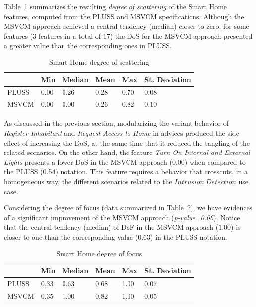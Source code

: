 \documentclass{sig-alt-full}
\begin{document}
Table~\ref{tab:sh-dos} summarizes the resulting \emph{degree of scattering} of
the Smart Home features, computed from the PLUSS and MSVCM specifications.
Although the MSVCM approach achieved a central tendency (median) closer to
zero, for some features (3 features in a total of 17) the DoS for the MSVCM approach
presented a greater value than the corresponding ones in PLUSS.


\begin{table}[htb]
\centering
\caption{Smart Home degree of scattering}
\label{tab:sh-dos}
\begin{small}
\begin{tabular}{llllll} \hline
					& Min 	& Median 	& Mean 	& Max 	& St. Deviation \\ \hline 
	PLUSS			& 0.00  & 0.26   	& 0.28  & 0.70 	& 0.08 			\\
	MSVCM	& 0.00  & 0.00  	& 0.26 	& 0.82 & 0.10  		\\ \hline	
\end{tabular}
\end{small}
\end{table}

As discussed in the previous section, modularizing the variant behavior of
\emph{Register Inhabitant} and \emph{Request Access to Home} in advices produced the side effect of increasing the DoS, at the same time that it reduced
the tangling of the related scenarios. On the other hand, the feature \emph{Turn
On Internal and External Lights} presents a lower DoS in the MSVCM approach
(0.00) when compared to the PLUSS (0.54) notation. This feature requires a
behavior that crosscuts, in a homogeneous way, the different scenarios related to
the $Intrusion\ Detection$ use case.


Considering the degree of focus (data summarized in Table~\ref{tab:sh-dof}), we
have evidences of a significant improvement of the MSVCM approach
(\emph{p-value=0.06}). Notice that the central tendency (median) of DoF in the
MSVCM approach ($1.00$) is closer to one than the corresponding value
($0.63$) in the PLUSS notation.

\begin{table}[htb] \centering
\caption{Smart Home degree of focus}
\label{tab:sh-dof}
\begin{small}
\begin{tabular}{llllll} \hline
					& Min 	& Median 	& Mean 	& Max 	& St. Deviation \\ \hline 
	PLUSS			& 0.33  & 0.63   	& 0.68  & 1.00 	& 0.07 			\\
	MSVCM			& 0.35  & 1.00   	& 0.82 	& 1.00 	& 0.05			\\ \hline	
\end{tabular}
\end{small}
\end{table}
\end{document}
